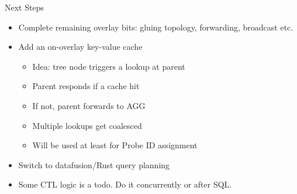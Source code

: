 \documentclass{beamer}
\begin{document}
\begin{frame}{Next Steps}
	\begin{itemize}
		\item Complete remaining overlay bits: gluing topology, forwarding, broadcast etc.
		\item Add an on-overlay key-value cache
		      \begin{itemize}
			      \item Idea: tree node triggers a lookup at parent
			      \item Parent responds if a cache hit
			      \item If not, parent forwards to AGG
			      \item Multiple lookups get coalesced
			      \item Will be used at least for Probe ID assignment
		      \end{itemize}
		\item Switch to datafusion/Rust query planning
		\item Some CTL logic is a todo. Do it concurrently or after SQL.

	\end{itemize}
\end{frame}
\end{document}
